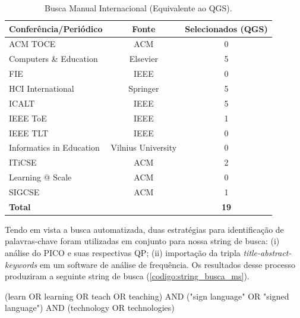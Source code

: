 \begin{table}[htb]
\centering
\caption{Busca Manual Internacional (Equivalente ao QGS).}
\label{ms:table:busca-manual-internacional}
\begin{tabular}{l|c|c} \hline
\textbf{Conferência/Periódico} & \textbf{Fonte}     & \textbf{Selecionados (QGS)} \\ \hline
ACM TOCE                       & ACM                & 0            \\ 
Computers \& Education         & Elsevier           & 5            \\ 
FIE                            & IEEE               & 0            \\ 
HCI International              & Springer           & 5            \\ 
ICALT                          & IEEE               & 5            \\ 
IEEE ToE                       & IEEE               & 1            \\ 
IEEE TLT                       & IEEE               & 0            \\ 
Informatics in Education       & Vilnius University & 0            \\ 
ITiCSE                         & ACM                & 2            \\ 
Learning @ Scale               & ACM                & 0            \\ 
SIGCSE                         & ACM                & 1            \\ \hline
\multicolumn{2}{l}{\textbf{Total}}                  & \textbf{19}  \\ \hline
\end{tabular}
\end{table}

Tendo em vista a busca automatizada, duas estratégias para identificação de palavras-chave foram utilizadas em conjunto para nossa string de busca: (i) análise do PICO e suas respectivas QP; (ii) importação da tripla \textit{title-abstract-keywords} em um software de análise de frequência. Os resultados desse processo produziram a seguinte string de busca (\autoref{codigo:string_busca_ms}).

\begin{codigo}[caption={String de Busca do MS}, label={codigo:string_busca_ms}]
    (learn OR learning OR teach OR teaching) AND
    ("sign language" OR "signed language") AND
    (technology OR technologies)
\end{codigo}

